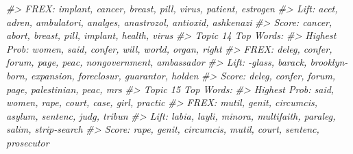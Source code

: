 \documentclass[]{book}
\newenvironment{Shaded}{\begin{snugshade}}{\end{snugshade}}
\newcommand{\CommentTok}[1]{\textcolor[rgb]{0.56,0.35,0.01}{\textit{#1}}}
\begin{document}
\begin{Shaded}
\begin{Highlighting}[]
\CommentTok{#>       FREX: implant, cancer, breast, pill, virus, patient, estrogen }
\CommentTok{#>       Lift: acet, adren, ambulatori, analges, anastrozol, antioxid, ashkenazi }
\CommentTok{#>       Score: cancer, abort, breast, pill, implant, health, virus }
\CommentTok{#> Topic 14 Top Words:}
\CommentTok{#>       Highest Prob: women, said, confer, will, world, organ, right }
\CommentTok{#>       FREX: deleg, confer, forum, page, peac, nongovernment, ambassador }
\CommentTok{#>       Lift: -glass, barack, brooklyn-born, expansion, foreclosur, guarantor, holden }
\CommentTok{#>       Score: deleg, confer, forum, page, palestinian, peac, mrs }
\CommentTok{#> Topic 15 Top Words:}
\CommentTok{#>       Highest Prob: said, women, rape, court, case, girl, practic }
\CommentTok{#>       FREX: mutil, genit, circumcis, asylum, sentenc, judg, tribun }
\CommentTok{#>       Lift: labia, layli, minora, multifaith, paraleg, salim, strip-search }
\CommentTok{#>       Score: rape, genit, circumcis, mutil, court, sentenc, prosecutor}


\end{Highlighting}
\end{Shaded}
\end{document}
